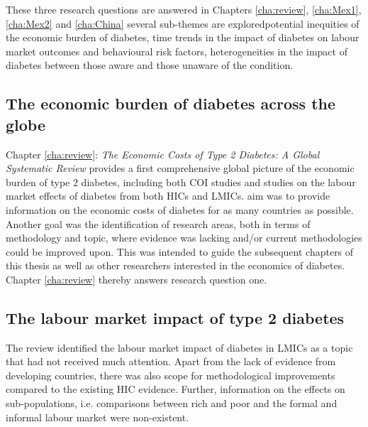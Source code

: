 These three research questions are answered in Chapters \ref{cha:review}, \ref{cha:Mex1}, \ref{cha:Mex2} and \ref{cha:China} \DIFdelbegin {}\DIFdelend \DIFaddbegin {}\DIFaddend several sub-themes are explored\DIFdelbegin {}\DIFdelend \DIFaddbegin {}\DIFaddend potential inequities of the economic burden of diabetes, time trends in the impact of diabetes on labour market outcomes and behavioural risk factors, \DIFdelbegin {}\DIFdelend heterogeneities in the impact of diabetes between those aware and those unaware of the condition\DIFaddbegin {}\DIFaddend .


\DIFdelbegin %
\DIFdelend \DIFaddbegin \subsection{The economic burden of diabetes across the globe}
\DIFaddend 

Chapter \ref{cha:review}: \textit{The Economic Costs of Type 2 Diabetes: A Global Systematic Review} provides a first comprehensive global picture of the economic burden of type 2 diabetes, including both \ac{COI} studies and studies on the labour market effects of diabetes from both \acp{HIC} and \acp{LMIC}. \DIFdelbegin {}\DIFdelend \DIFaddbegin {}\DIFaddend aim was to provide information on the economic costs of diabetes for as many countries as possible. Another goal was the identification of research areas, both in terms of methodology and topic, where evidence was lacking and/or current methodologies could be improved upon. This was intended to guide the subsequent chapters of this thesis as well as other researchers interested in the economics of diabetes. Chapter \ref{cha:review} thereby answers research question one.

\subsection{The labour market impact of type 2 diabetes}

The review identified the labour market impact of diabetes in \acp{LMIC} as a topic that had not received much attention. Apart from the lack of evidence from developing countries, there was also scope for methodological improvements compared to the existing \ac{HIC} evidence. Further, information on the effects on sub-populations, i.e. comparisons between rich and poor and the formal and informal labour market were non-existent.

